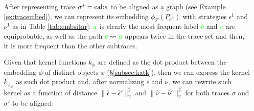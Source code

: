 \begin{example}
{After representing trace $\sigma^*=\textup{caba}$ to be aligned as a graph (see Example \ref{ex:tracembed}), we can represent its}
embedding $\phi_{\mathcal{P}}(P_{\sigma^*})$ with strategies $\epsilon^1$ and $\nu^1$ %
{as} in Table \ref{tab:embsitar}: ${\color{green}a}$ is clearly the most frequent label ${\color{green}b}$ and ${\color{green}c}$ are equiprobable, as well as the path ${\color{green}c}\rightsquigarrow {\color{green}a}$ appears twice in the trace set and then, it is more frequent than the other subtraces. 
\end{example}


Given that kernel functions $k_\phi$ are defined as the dot product between the embedding $\phi$ of distinct objects $x$ (\S\ref{subsec:katk}), then we can express the kernel $k_{\phi_{\mathcal{P}}}$ as such dot product and, after normalizing $\epsilon$ and $\nu$, we can rewrite such kernel
{as a function of distance  $\|\hat{\epsilon}-\hat{\epsilon}'\|_2^2$ and $\|\hat{\nu}-\hat{\nu}'\|_2^2$ for both traces $\sigma$ and $\sigma'$ to be aligned:}

